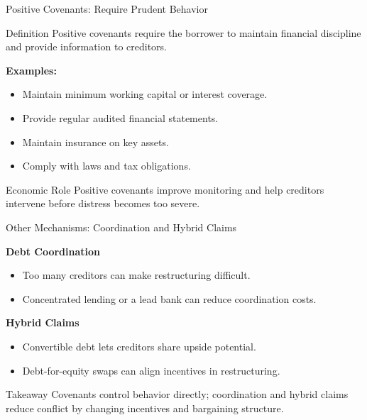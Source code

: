 \begin{frame}{Positive Covenants: Require Prudent Behavior}

\begin{block}{Definition}
Positive covenants require the borrower to maintain financial discipline
and provide information to creditors.
\end{block}

\vspace{0.3cm}

\textbf{Examples:}
\begin{itemize}
    \item Maintain minimum working capital or interest coverage.
    \item Provide regular audited financial statements.
    \item Maintain insurance on key assets.
    \item Comply with laws and tax obligations.
\end{itemize}

\vfill

\begin{alertblock}{Economic Role}
Positive covenants improve monitoring and help creditors intervene before
distress becomes too severe.
\end{alertblock}

\end{frame}

\begin{frame}{Other Mechanisms: Coordination and Hybrid Claims}

\textbf{Debt Coordination}
\begin{itemize}
    \item Too many creditors can make restructuring difficult.
    \item Concentrated lending or a lead bank can reduce coordination costs.
\end{itemize}

\vspace{0.3cm}

\textbf{Hybrid Claims}
\begin{itemize}
    \item Convertible debt lets creditors share upside potential.
    \item Debt-for-equity swaps can align incentives in restructuring.
\end{itemize}

\vfill

\begin{alertblock}{Takeaway}
Covenants control behavior directly; coordination and hybrid claims reduce
conflict by changing incentives and bargaining structure.
\end{alertblock}

\end{frame}


